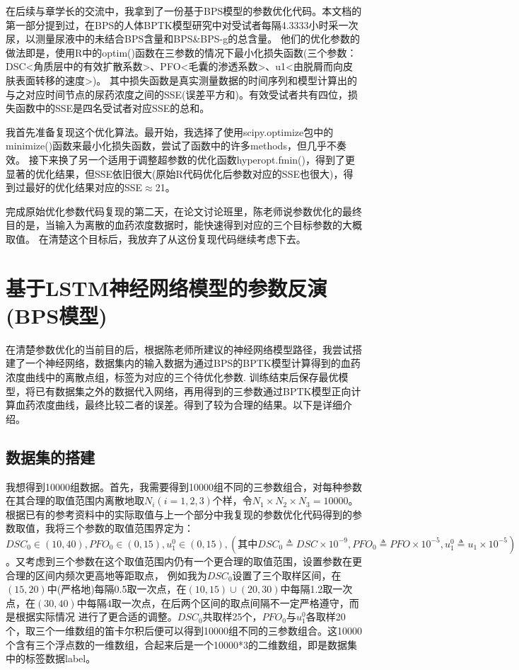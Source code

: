 \documentclass{article}
\begin{document}
在后续与章学长的交流中，我拿到了一份基于BPS模型的参数优化代码。本文档的第一部分提到过，在BPS的人体BPTK模型研究中对受试者每隔4.3333小时采一次尿，以测量尿液中的未结合BPS含量和BPS\&BPS-g的总含量。
他们的优化参数的做法即是，使用R中的optim()函数在三参数的情况下最小化损失函数(三个参数：DSC<角质层中的有效扩散系数>、PFO<毛囊的渗透系数>、u1<由脱屑而向皮肤表面转移的速度>)。
其中损失函数是真实测量数据的时间序列和模型计算出的与之对应时间节点的尿药浓度之间的SSE(误差平方和)。有效受试者共有四位，损失函数中的SSE是四名受试者对应SSE的总和。

我首先准备复现这个优化算法。最开始，我选择了使用scipy.optimize包中的minimize()函数来最小化损失函数，尝试了函数中的许多methods，但几乎不奏效。
接下来换了另一个适用于调整超参数的优化函数hyperopt.fmin()，得到了更显著的优化结果，但SSE依旧很大(原始R代码优化后参数对应的SSE也很大)，得到过最好的优化结果对应的SSE$\approx$21。

完成原始优化参数代码复现的第二天，在论文讨论班里，陈老师说参数优化的最终目的是，当输入为离散的血药浓度数据时，能快速得到对应的三个目标参数的大概取值。
在清楚这个目标后，我放弃了从这份复现代码继续考虑下去。


\section*{基于LSTM神经网络模型的参数反演(BPS模型)}

在清楚参数优化的当前目的后，根据陈老师所建议的神经网络模型路径，我尝试搭建了一个神经网络，数据集内的输入数据为通过BPS的BPTK模型计算得到的血药浓度曲线中的离散点组，标签为对应的三个待优化参数.
训练结束后保存最优模型，将已有数据集之外的数据代入网络，再用得到的三参数通过BPTK模型正向计算血药浓度曲线，最终比较二者的误差。得到了较为合理的结果。以下是详细介绍。

\subsection*{数据集的搭建}
我想得到10000组数据。首先，我需要得到10000组不同的三参数组合，对每种参数在其合理的取值范围内离散地取$N_i(i=1,2,3)$个样，令$N_1\times N_2\times N_3=10000$。
根据已有的参考资料中的实际取值与上一个部分中我复现的参数优化代码得到的参数取值，我将三个参数的取值范围界定为：$DSC_0\in (10,40),PFO_0\in (0,15),u_1^0\in (0,15),(其中DSC_0\triangleq DSC
\times 10^{-9},PFO_0 \triangleq PFO\times 10^{-5},u_1^0\triangleq u_1\times 10^{-5})$。又考虑到三个参数在这个取值范围内仍有一个更合理的取值范围，设置参数在更合理的区间内频次更高地等距取点，
例如我为$DSC_0$设置了三个取样区间，在$(15,20)$中(严格地)每隔0.5取一次点，在$(10,15)\cup (20,30)$中每隔1.2取一次点，在$(30,40)$中每隔4取一次点，在后两个区间的取点间隔不一定严格遵守，而是根据实际情况
进行了更合适的调整。$DSC_0$共取样25个，$PFO_0$与$u_1^0$各取样20个，取三个一维数组的笛卡尔积后便可以得到10000组不同的三参数组合。这10000个含有三个浮点数的一维数组，合起来后是一个10000*3的二维数组，即是数据集中的标签数据label。
\end{document}
